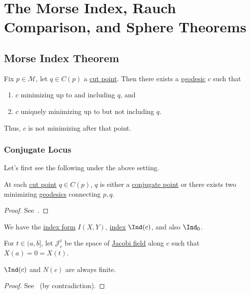 \chapter{The Morse Index, Rauch Comparison, and Sphere Theorems}
\section{Morse Index Theorem}
\begin{prev}
	Fix \(p\in \mathcal{M} \), let \(q\in C(p)\) a \hyperref[def:cut-point]{cut point}. Then there exists a \hyperref[def:geodesic]{geodesic} \(c\) such that
	\begin{enumerate}
		\item \(c\) minimizing up to and including \(q\), and
		\item \(c\) uniquely minimizing up to but not including \(q\).
	\end{enumerate}
	Thus, \(c\) is not minimizing after that point.
\end{prev}

\subsection{Conjugate Locus}
Let's first see the following under the above setting.

\begin{proposition}\label{prop:lec21}
	At each \hyperref[def:cut-point]{cut point} \(q\in C(p)\), \(q\) is either a \hyperref[def:conjugate-point]{conjugate point} or there exists two minimizing \hyperref[def:geodesic]{geodesics} connecting \(p, q\).
\end{proposition}
\begin{proof}
	See~\cite{flaherty2013riemannian}.
\end{proof}

\begin{prev}
	We have the \hyperref[def:index-form]{index form} \(I(X, Y)\), \hyperref[def:index]{index} \(\Ind(c)\), and also \(\Ind_0 \).
\end{prev}

For \(t\in (a, b]\), let \(\mathcal{J} _c^t\) be the space of \hyperref[def:Jacobi-field]{Jacobi field} along \(c\) such that \(X(a) = 0 = X(t)\).

\begin{lemma}\label{lma:finite-index-nullity}
	\(\Ind(c)\) and \(N(c)\) are always finite.
\end{lemma}
\begin{proof}
	See~\cite{flaherty2013riemannian} (by contradiction).
\end{proof}

